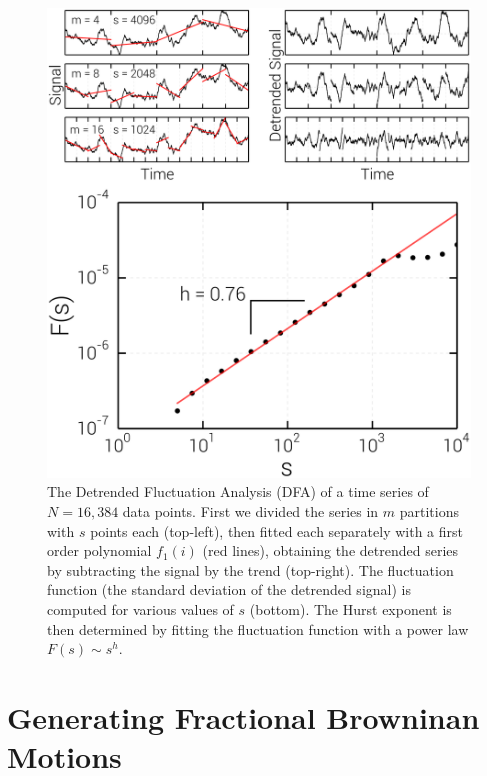 \begin{figure}[t]
    \begin{center}
        \includegraphics[scale=0.25]{chapters/ch6-asle/figs/dfa}
    \end{center}
    \caption{The Detrended Fluctuation Analysis (DFA) of a time series of
        $N=16,384$ data points. First we divided the series in $m$ partitions with
        $s$ points each (top-left), then fitted each separately with a first order
        polynomial $f_1(i)$ (red lines), obtaining the detrended series by subtracting
        the signal by the trend (top-right).  The fluctuation function (the standard
        deviation of the detrended signal) is computed for various values of $s$
        (bottom).  The Hurst exponent is then determined by fitting the fluctuation
        function with a power law $F(s)\sim s^h$.}
\label{fig:dfa}
\end{figure}


\section{Generating Fractional Browninan Motions}
\label{sec:fbm}

